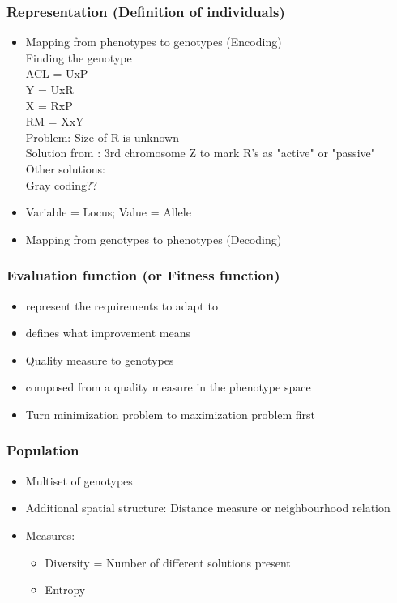     \subsubsection{Representation (Definition of individuals)}
        \begin{itemize}
            \item Mapping from phenotypes to genotypes (Encoding)\\
            Finding the genotype \cite{Igor}\\
            ACL = UxP\\
            Y = UxR\\
            X = RxP\\
            RM = XxY\\
            Problem: Size of R is unknown\\
            Solution from \cite{Igor}: 3rd chromosome Z to mark R's as "active" or "passive"\\
            Other solutions: \\
            Gray coding??
            \item Variable = Locus; Value = Allele
            \item Mapping from genotypes to phenotypes (Decoding)
        \end{itemize}
    \subsubsection{Evaluation function (or Fitness function)}
        \begin{itemize}
            \item represent the requirements to adapt to
            \item defines what improvement means
            \item Quality measure to genotypes
            \item composed from a quality measure in the phenotype space
            \item Turn minimization problem to maximization problem first
        \end{itemize}
    \subsubsection{Population}
        \begin{itemize}
            \item Multiset of genotypes
            \item Additional spatial structure: Distance measure or neighbourhood relation
            \item Measures:
            \begin{itemize}
                \item Diversity = Number of different solutions present
                \item Entropy
            \end{itemize}
        \end{itemize}
